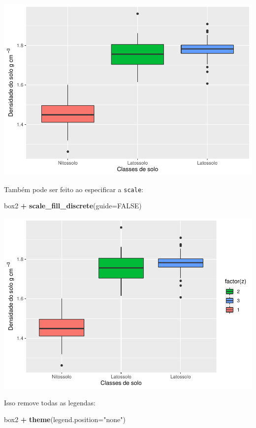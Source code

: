 \documentclass[
]{book}
\newenvironment{Shaded}{\begin{snugshade}}{\end{snugshade}}
\newcommand{\DataTypeTok}[1]{\textcolor[rgb]{0.13,0.29,0.53}{#1}}
\newcommand{\KeywordTok}[1]{\textcolor[rgb]{0.13,0.29,0.53}{\textbf{#1}}}
\newcommand{\NormalTok}[1]{#1}
\newcommand{\OperatorTok}[1]{\textcolor[rgb]{0.81,0.36,0.00}{\textbf{#1}}}
\newcommand{\OtherTok}[1]{\textcolor[rgb]{0.56,0.35,0.01}{#1}}
\newcommand{\StringTok}[1]{\textcolor[rgb]{0.31,0.60,0.02}{#1}}
\begin{document}
\includegraphics{TudodoR_files/figure-latex/unnamed-chunk-210-1.pdf}

Também pode ser feito ao especificar a \texttt{scale}:

\begin{Shaded}
\begin{Highlighting}[]
\NormalTok{box2 }\OperatorTok{+}\StringTok{ }\KeywordTok{scale_fill_discrete}\NormalTok{(}\DataTypeTok{guide=}\OtherTok{FALSE}\NormalTok{)}
\end{Highlighting}
\end{Shaded}

\includegraphics{TudodoR_files/figure-latex/unnamed-chunk-211-1.pdf}

Isso remove todas as legendas:

\begin{Shaded}
\begin{Highlighting}[]
\NormalTok{box2 }\OperatorTok{+}\StringTok{ }\KeywordTok{theme}\NormalTok{(}\DataTypeTok{legend.position=}\StringTok{"none"}\NormalTok{)}
\end{Highlighting}
\end{Shaded}
\end{document}
